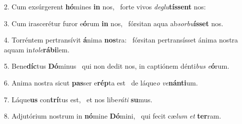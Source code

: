 2. Cum exsúrgerent \textbf{hó}mines \textbf{in} nos, \ast\  forte vivos \textit{de}\textit{glu}\textbf{tís}\textbf{sent} nos:\

3. Cum irascerétur furor e\textbf{ó}rum \textbf{in} nos, \ast\  fórsitan aqua ab\textit{sor}\textit{bu}\textbf{ís}\textbf{set} nos.\

4. Torréntem pertransívit \textbf{á}nima \textbf{nos}tra: \ast\  fórsitan pertransísset ánima nostra aquam in\textit{to}\textit{le}\textbf{rá}\textbf{bi}lem.\

5. Bene\textbf{díc}tus \textbf{Dó}minus \ast\  qui non dedit nos, in captiónem dénti\textit{bus} \textit{e}\textbf{ó}rum.\

6. Anima nostra sicut \textbf{pas}ser e\textbf{rép}ta est \ast\  de láque\textit{o} \textit{ve}\textbf{nán}\textbf{ti}um.\

7. Láque\textbf{us} con\textbf{trí}tus est, \ast\  et nos libe\textit{rá}\textit{ti} \textbf{su}mus.\

8. Adjutórium nostrum in \textbf{nó}mine \textbf{Dó}mini, \ast\  qui fecit cæ\textit{lum} \textit{et} \textbf{ter}ram.\

